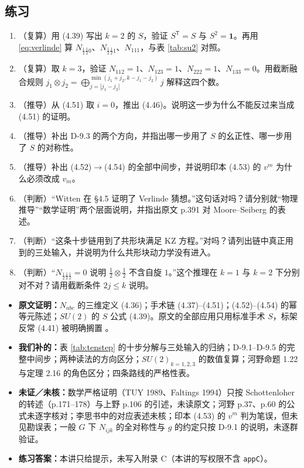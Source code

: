 \subsection{练习}

\begin{enumerate}[leftmargin=*]
  \item （复算）用 (4.39) 写出 $k=2$ 的 $S$，验证 $S^{\mathsf T}=S$ 与 $S^2=\mathbf 1$。再用 \eqref{eq:verlinde} 算 $N_{\frac12\frac12 0}$、$N_{\frac12\frac12 1}$、$N_{111}$，与表 \ref{tab:su2} 对照。
  \item （复算）取 $k=3$，验证 $N_{112}=1$、$N_{123}=1$、$N_{222}=1$、$N_{133}=0$。用截断融合规则 $j_1\otimes j_2=\bigoplus_{j=|j_1-j_2|}^{\min(j_1+j_2,k-j_1-j_2)}j$ 解释这四个数。
  \item （推导）从 (4.51) 取 $i=0$，推出 (4.46)。说明这一步为什么不能反过来当成 (4.51) 的证明。
  \item （推导）补出 D-9.3 的两个方向，并指出哪一步用了 $S$ 的幺正性、哪一步用了 $S$ 的对称性。
  \item （推导）补出 (4.52)$\to$(4.54) 的全部中间步，并说明印本 (4.53) 的 $v^m$ 为什么必须改成 $v_m$。
  \item （判断）“Witten 在 \S4.5 证明了 Verlinde 猜想。”这句话对吗？请分别就“物理推导”“数学证明”两个层面说明，并指出原文 p.391 对 Moore--Seiberg 的表述。
  \item （判断）“这条十步链用到了共形块满足 KZ 方程。”对吗？请列出链中真正用到的三处输入，并说明为什么共形块动力学没有进入。
  \item （判断）“$N_{\frac12\frac12\frac12}=0$ 说明 $\frac12\otimes\frac12$ 不含自旋 $1$。”这个推理在 $k=1$ 与 $k=2$ 下分别对不对？请用截断条件 $2j\le k$ 说明。
\end{enumerate}

\begin{boundary}
\begin{itemize}[leftmargin=1.4em]
  \item \textbf{原文证明：}$N_{abc}$ 的三维定义 (4.36)；手术链 (4.37)--(4.51)；(4.52)--(4.54) 的幂等元陈述；$SU(2)$ 的 $S$ 公式 (4.39)。原文的全部应用只用标准手术 $S$，标架反常 (4.41) 被明确搁置 。
  \item \textbf{我们补的：}表 \ref{tab:tenstep} 的十步分解与三处输入的归纳；D-9.1--D-9.5 的完整中间步；两种读法的方向区分；$SU(2)_{k=1,2,3}$ 的数值复算；河野命题 1.22 与定理 2.16 的角色区分；四条路线的严格性表。
  \item \textbf{未证／未核：}数学严格证明（TUY 1989、Faltings 1994）只按 Schottenloher 的转述（p.171--178）与上野 p.106 的引述，未读原文；河野 p.37、p.60 的公式未逐字核对；李思书中的对应表述未核；印本 (4.53) 的 $v^m$ 判为笔误，但未见勘误表；一般 $G$ 下 $N_{ijk}$ 的全对称性与 $g$ 的约定只按 D-9.1 的说明，未逐群验证。
  \item \textbf{练习答案：}本讲只给提示，未写入附录 C（本讲的写权限不含 \texttt{appC}）。
\end{itemize}
\end{boundary}
